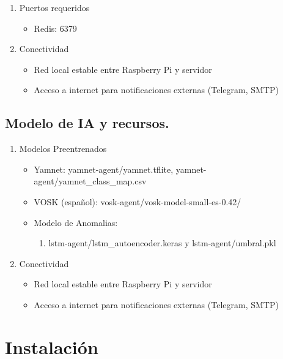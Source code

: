 \begin{enumerate}
  \item Puertos requeridos
        \begin{itemize}
          \item Redis: 6379
        \end{itemize}
  \item Conectividad
        \begin{itemize}
          \item Red local estable entre Raspberry Pi y servidor
          \item Acceso a internet para notificaciones externas (Telegram, SMTP)
        \end{itemize}
\end{enumerate}

\subsection*{Modelo de IA y recursos.}

\begin{enumerate}
  \item Modelos Preentrenados
        \begin{itemize}
          \item Yamnet: yamnet-agent/yamnet.tflite, yamnet-agent/yamnet\_class\_map.csv
          \item VOSK (español): vosk-agent/vosk-model-small-es-0.42/
          \item Modelo de Anomalias:
                \begin{enumerate}
                  \item lstm-agent/lstm\_autoencoder.keras y lstm-agent/umbral.pkl
                \end{enumerate}
        \end{itemize}
  \item Conectividad
        \begin{itemize}
          \item Red local estable entre Raspberry Pi y servidor
          \item Acceso a internet para notificaciones externas (Telegram, SMTP)
        \end{itemize}
\end{enumerate}

\section*{Instalación}

